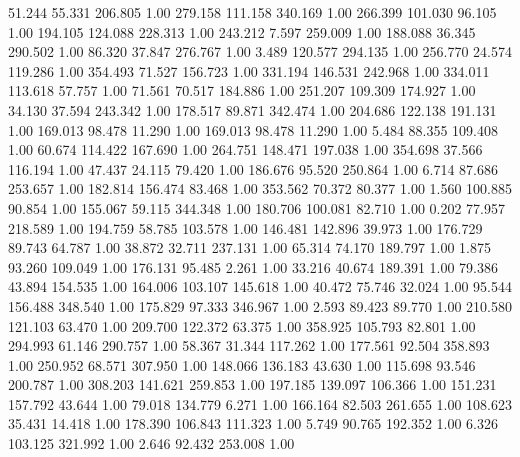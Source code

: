   51.244   55.331  206.805         1.00
 279.158  111.158  340.169         1.00
 266.399  101.030   96.105         1.00
 194.105  124.088  228.313         1.00
 243.212    7.597  259.009         1.00
 188.088   36.345  290.502         1.00
  86.320   37.847  276.767         1.00
   3.489  120.577  294.135         1.00
 256.770   24.574  119.286         1.00
 354.493   71.527  156.723         1.00
 331.194  146.531  242.968         1.00
 334.011  113.618   57.757         1.00
  71.561   70.517  184.886         1.00
 251.207  109.309  174.927         1.00
  34.130   37.594  243.342         1.00
 178.517   89.871  342.474         1.00
 204.686  122.138  191.131         1.00
 169.013   98.478   11.290         1.00
 169.013   98.478   11.290         1.00
   5.484   88.355  109.408         1.00
  60.674  114.422  167.690         1.00
 264.751  148.471  197.038         1.00
 354.698   37.566  116.194         1.00
  47.437   24.115   79.420         1.00
 186.676   95.520  250.864         1.00
   6.714   87.686  253.657         1.00
 182.814  156.474   83.468         1.00
 353.562   70.372   80.377         1.00
   1.560  100.885   90.854         1.00
 155.067   59.115  344.348         1.00
 180.706  100.081   82.710         1.00
   0.202   77.957  218.589         1.00
 194.759   58.785  103.578         1.00
 146.481  142.896   39.973         1.00
 176.729   89.743   64.787         1.00
  38.872   32.711  237.131         1.00
  65.314   74.170  189.797         1.00
   1.875   93.260  109.049         1.00
 176.131   95.485    2.261         1.00
  33.216   40.674  189.391         1.00
  79.386   43.894  154.535         1.00
 164.006  103.107  145.618         1.00
  40.472   75.746   32.024         1.00
  95.544  156.488  348.540         1.00
 175.829   97.333  346.967         1.00
   2.593   89.423   89.770         1.00
 210.580  121.103   63.470         1.00
 209.700  122.372   63.375         1.00
 358.925  105.793   82.801         1.00
 294.993   61.146  290.757         1.00
  58.367   31.344  117.262         1.00
 177.561   92.504  358.893         1.00
 250.952   68.571  307.950         1.00
 148.066  136.183   43.630         1.00
 115.698   93.546  200.787         1.00
 308.203  141.621  259.853         1.00
 197.185  139.097  106.366         1.00
 151.231  157.792   43.644         1.00
  79.018  134.779    6.271         1.00
 166.164   82.503  261.655         1.00
 108.623   35.431   14.418         1.00
 178.390  106.843  111.323         1.00
   5.749   90.765  192.352         1.00
   6.326  103.125  321.992         1.00
   2.646   92.432  253.008         1.00
